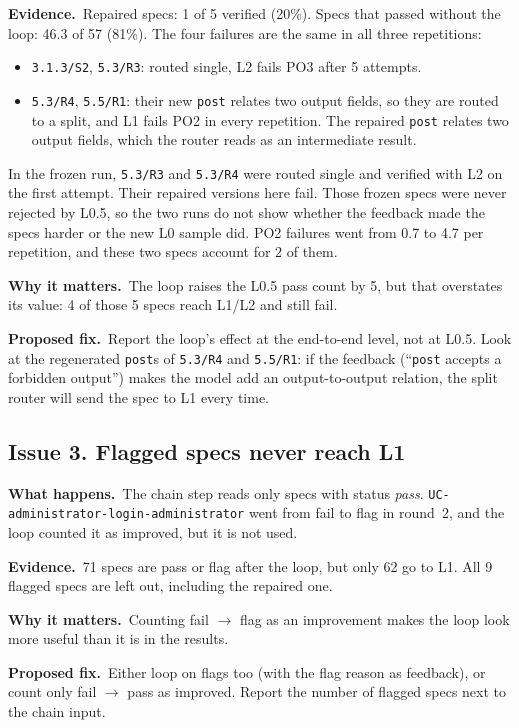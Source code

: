 \documentclass[10pt,a4paper]{article}
\newcommand{\code}[1]{\texttt{\small #1}}
\newcommand{\what}{\par\smallskip\textbf{What happens.}~}
\newcommand{\evidence}{\par\smallskip\textbf{Evidence.}~}
\newcommand{\why}{\par\smallskip\textbf{Why it matters.}~}
\newcommand{\fix}{\par\smallskip\textbf{Proposed fix.}~}
\begin{document}
\evidence Repaired specs: 1 of 5 verified (20\%). Specs that passed without the loop: 46.3 of 57 (81\%). The four
failures are the same in all three repetitions:
\begin{itemize}
\item \code{3.1.3/S2}, \code{5.3/R3}: routed single, L2 fails PO3 after 5 attempts.
\item \code{5.3/R4}, \code{5.5/R1}: their new \code{post} relates two output fields, so they are routed to a split, and L1
      fails PO2 in every repetition. The repaired \code{post} relates two output fields, which the router reads as an
      intermediate result.
\end{itemize}
In the frozen run, \code{5.3/R3} and \code{5.3/R4} were routed single and verified with L2 on the first attempt. Their
repaired versions here fail. Those frozen specs were never rejected by L0.5, so the two runs do not show whether
the feedback made the specs harder or the new L0 sample did.
PO2 failures went from 0.7 to 4.7 per repetition, and these two specs account for 2 of them.

\why The loop raises the L0.5 pass count by 5, but that overstates its value: 4 of those 5 specs reach L1/L2 and still fail.

\fix Report the loop's effect at the end-to-end level, not at L0.5. Look at the regenerated \code{post}s of \code{5.3/R4}
and \code{5.5/R1}: if the feedback (``\code{post} accepts a forbidden output'') makes the model add an output-to-output
relation, the split router will send the spec to L1 every time.

\subsection*{Issue 3. Flagged specs never reach L1}
\what The chain step reads only specs with status \emph{pass}. \code{UC-administrator-login-administrator} went from fail to
flag in round~2, and the loop counted it as improved, but it is not used.

\evidence 71 specs are pass or flag after the loop, but only 62 go to L1. All 9 flagged specs are left out, including the
repaired one.

\why Counting fail $\rightarrow$ flag as an improvement makes the loop look more useful than it is in the results.

\fix Either loop on flags too (with the flag reason as feedback), or count only fail $\rightarrow$ pass as improved. Report
the number of flagged specs next to the chain input.
\end{document}
